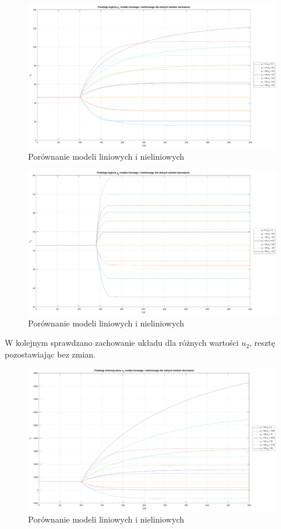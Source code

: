 \begin{figure}[H]
    \centering
    \includegraphics[scale=0.35]{images/y1_u1=60_u2=31_dt=0.1.eps}
    \caption{Porównanie modeli liniowych i nieliniowych}
\end{figure}

\begin{figure}[H]
    \centering
    \includegraphics[scale=0.35]{images/y2_u1=60_u2=31_dt=0.1.eps}
    \caption{Porównanie modeli liniowych i nieliniowych}
\end{figure}

W kolejnym sprawdzano zachowanie układu dla różnych wartości $u_2$, resztę pozostawiając bez zmian.

\begin{figure}[H]
    \centering
    \includegraphics[scale=0.35]{images/x1_u1=20_u2=93_dt=0.1.eps}
    \caption{Porównanie modeli liniowych i nieliniowych}
\end{figure}


